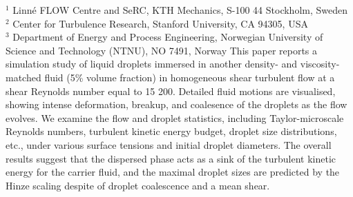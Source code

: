 %
%
%
%
%
%
%
\paperaffiliation
{%
  $^1$ Linn\'e FLOW Centre and SeRC, KTH Mechanics, S-100 44 Stockholm, Sweden\\%
  $^2$ Center for Turbulence Research, Stanford University, CA 94305, USA\\%
  $^3$ Department of Energy and Process Engineering, Norwegian University of Science and Technology (NTNU), NO 7491, Norway%
}%
%
%
%
%
%
\papernumber{}%
%
%
%
%
%
\papersummary%
{%
   This paper reports a simulation study of liquid droplets immersed in another density- and viscosity-matched fluid (5\% volume fraction)
   in homogeneous shear turbulent flow at a shear Reynolds number equal to 15 200.
   Detailed fluid motions are visualised, showing intense deformation, breakup, and coalesence of the droplets as the flow evolves.
   We examine the flow and droplet statistics, including Taylor-microscale Reynolds numbers, turbulent kinetic energy budget, droplet size distributions, etc.,
   under various surface tensions and initial droplet diameters.
   The overall results suggest that the dispersed phase acts as a sink of the turbulent kinetic energy for the carrier fluid, and
   the maximal droplet sizes are predicted by the Hinze scaling despite of droplet coalescence and a mean shear.
}%
%
\graphicspath{{paper5/}}%
%
%
%
